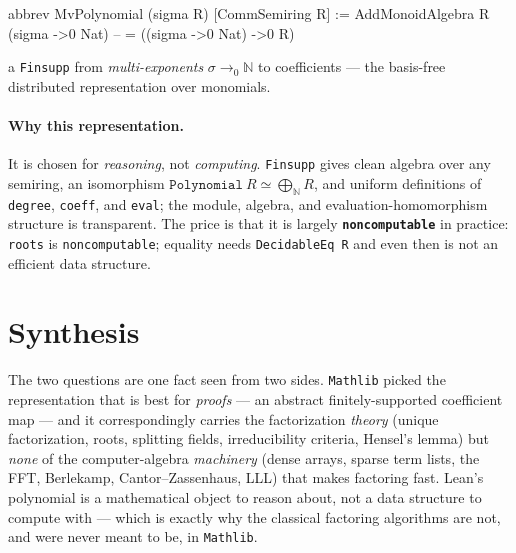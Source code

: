 \documentclass[11pt]{article}
\newcommand{\NN}{\mathbb{N}}
\newcommand{\finsupp}{\to_{0}}        %
\newcommand{\code}[1]{\texttt{#1}}
\begin{document}
\begin{lean}
abbrev MvPolynomial (sigma R) [CommSemiring R] :=
  AddMonoidAlgebra R (sigma ->0 Nat)     -- = ((sigma ->0 Nat) ->0 R)
\end{lean}

\noindent a \code{Finsupp} from \emph{multi-exponents} $\sigma \finsupp \NN$ to
coefficients --- the basis-free distributed representation over monomials.

\paragraph{Why this representation.} It is chosen for \emph{reasoning}, not
\emph{computing}. \code{Finsupp} gives clean algebra over any semiring, an
isomorphism $\code{Polynomial}\ R \simeq \bigoplus_{\NN} R$, and uniform
definitions of \code{degree}, \code{coeff}, and \code{eval}; the module, algebra,
and evaluation-homomorphism structure is transparent. The price is that it is
largely \textbf{\code{noncomputable}} in practice: \code{roots} is
\code{noncomputable}; equality needs \code{DecidableEq R} and even then is not an
efficient data structure.

\section{Synthesis}

The two questions are one fact seen from two sides. \code{Mathlib} picked the
representation that is best for \emph{proofs} --- an abstract finitely-supported
coefficient map --- and it correspondingly carries the factorization
\emph{theory} (unique factorization, roots, splitting fields, irreducibility
criteria, Hensel's lemma) but \emph{none} of the computer-algebra
\emph{machinery} (dense arrays, sparse term lists, the FFT, Berlekamp,
Cantor--Zassenhaus, LLL) that makes factoring fast. Lean's polynomial is a
mathematical object to reason about, not a data structure to compute with ---
which is exactly why the classical factoring algorithms are not, and were never
meant to be, in \code{Mathlib}.
\end{document}
